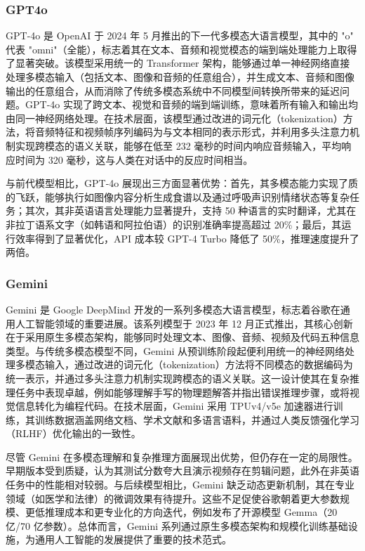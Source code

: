 \subsubsection{GPT4o}
\label{sec:TOSWT-gen-gpt4o}

GPT-4o \cite{gpt4o} 是 OpenAI 于 2024 年 5 月推出的下一代多模态大语言模型，其中的 "o" 代表 "omni"（全能），标志着其在文本、音频和视觉模态的端到端处理能力上取得了显著突破。该模型采用统一的 Transformer 架构，能够通过单一神经网络直接处理多模态输入（包括文本、图像和音频的任意组合），并生成文本、音频和图像输出的任意组合，从而消除了传统多模态系统中不同模型间转换所带来的延迟问题。GPT-4o 实现了跨文本、视觉和音频的端到端训练，意味着所有输入和输出均由同一神经网络处理。在技术层面，该模型通过改进的词元化（tokenization）方法，将音频特征和视频帧序列编码为与文本相同的表示形式，并利用多头注意力机制实现跨模态的语义关联，能够在低至 232 毫秒的时间内响应音频输入，平均响应时间为 320 毫秒，这与人类在对话中的反应时间相当。

与前代模型相比，GPT-4o 展现出三方面显著优势：首先，其多模态能力实现了质的飞跃，能够执行如图像内容分析生成食谱以及通过呼吸声识别情绪状态等复杂任务；其次，其非英语语言处理能力显著提升，支持 50 种语言的实时翻译，尤其在非拉丁语系文字（如韩语和阿拉伯语）的识别准确率提高超过 20\%；最后，其运行效率得到了显著优化，API 成本较 GPT-4 Turbo 降低了 50\%，推理速度提升了两倍。

\subsubsection{Gemini}
\label{sec:TOSWT-gen-gemini}

Gemini \cite{geminiteam2024geminifamilyhighlycapable} 是 Google DeepMind 开发的一系列多模态大语言模型，标志着谷歌在通用人工智能领域的重要进展。该系列模型于 2023 年 12 月正式推出，其核心创新在于采用原生多模态架构，能够同时处理文本、图像、音频、视频及代码五种信息类型。与传统多模态模型不同，Gemini 从预训练阶段起便利用统一的神经网络处理多模态输入，通过改进的词元化（tokenization）方法将不同模态的数据编码为统一表示，并通过多头注意力机制实现跨模态的语义关联。这一设计使其在复杂推理任务中表现卓越，例如能够理解手写的物理题解答并指出错误推理步骤，或将视觉信息转化为编程代码。在技术层面，Gemini 采用 TPUv4/v5e 加速器进行训练，其训练数据涵盖网络文档、学术文献和多语言语料，并通过人类反馈强化学习 \cite{kaufmann2024surveyreinforcementlearninghuman} （RLHF）优化输出的一致性。

尽管 Gemini 在多模态理解和复杂推理方面展现出优势，但仍存在一定的局限性。早期版本受到质疑，认为其测试分数夸大且演示视频存在剪辑问题，此外在非英语任务中的性能相对较弱。与后续模型相比，Gemini 缺乏动态更新机制，其在专业领域（如医学和法律）的微调效果有待提升。这些不足促使谷歌朝着更大参数规模、更低推理成本和更专业化的方向迭代，例如发布了开源模型 Gemma（20 亿/70 亿参数）。总体而言，Gemini 系列通过原生多模态架构和规模化训练基础设施，为通用人工智能的发展提供了重要的技术范式。

